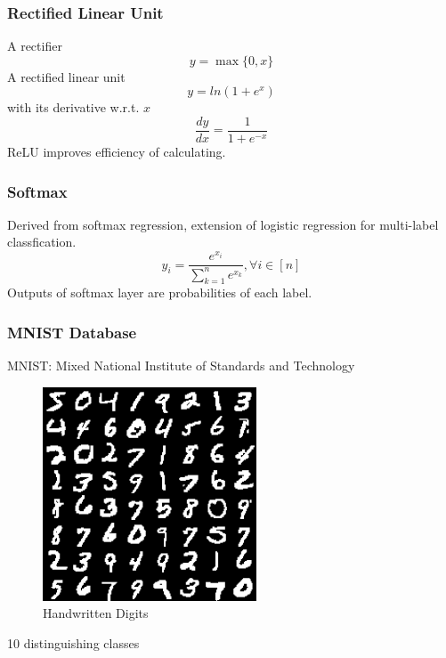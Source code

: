 \documentclass{beamer}
\begin{document}
\begin{frame}[label=relu]
\frametitle{Rectified Linear Unit}
\begin{minipage}[h]{.5\textwidth}
A rectifier
\begin{equation*}
y=\max\{0,x\}
\end{equation*}
A rectified linear unit
\begin{equation*}
y=ln(1+e^{x})
\end{equation*}
with its derivative w.r.t. $x$
\begin{equation*}
\frac{dy}{dx}=\frac{1}{1+e^{-x}}
\end{equation*}
ReLU improves efficiency of calculating.
\end{minipage}%
\begin{minipage}[h]{.5\textwidth}
\end{minipage}
\end{frame}

\begin{frame}[label=softmax]
\frametitle{Softmax}
Derived from softmax regression, extension of logistic regression for multi-label classfication.
\begin{equation*}
y_{i}=\frac{e^{x_{i}}}{\sum_{k=1}^{n}e^{x_{k}}},\forall i\in[n]
\end{equation*}
Outputs of softmax layer are probabilities of each label.
\end{frame}

\begin{frame}
\frametitle{MNIST Database}
MNIST: Mixed National Institute of Standards and Technology
\begin{figure}[htbp]
\centerline{\includegraphics[width=.4\textwidth]{mnist.png}}
\caption[]{Handwritten Digits}
\end{figure}
10 distinguishing classes
\end{frame}
\end{document}
